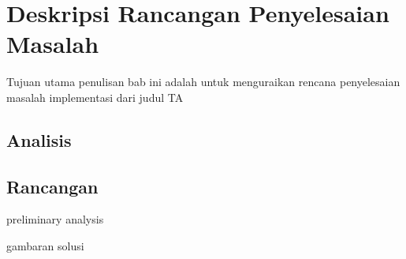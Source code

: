\chapter{Deskripsi Rancangan Penyelesaian Masalah}

Tujuan utama penulisan bab ini adalah untuk menguraikan rencana penyelesaian masalah implementasi dari judul TA



\section{Analisis}
\blindtext

\section{Rancangan}
\blindtext

preliminary analysis

gambaran solusi

